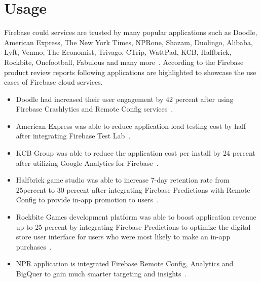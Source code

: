 \section{Usage}
Firebase could services are trusted by many popular applications such as 
Doodle\cite{hid-sp18-409-www-doodle}, American 
Express\cite{hid-sp18-409-www-americanexpress}, The New York 
Times\cite{hid-sp18-409-www-nytimes}, NPRone\cite{hid-sp18-409-www-npr}, 
Shazam\cite{hid-sp18-409-www-shazam}, Duolingo\cite{hid-sp18-409-www-duolingo}, 
Alibaba\cite{hid-sp18-409-www-alibaba}, Lyft\cite{hid-sp18-409-www-lyft}, 
Venmo\cite{hid-sp18-409-www-venmo}, The 
Economist\cite{hid-sp18-409-www-economist}, 
Trivago\cite{hid-sp18-409-www-trivago}, CTrip\cite{hid-sp18-409-www-ctrip}, 
WattPad\cite{hid-sp18-409-www-wattpad}, KCB\cite{hid-sp18-409-www-kcbgroup}, 
Halfbrick\cite{hid-sp18-409-www-halfbrick}, 
Rockbite\cite{hid-sp18-409-www-rockbitegames}, 
Onefootball\cite{hid-sp18-409-www-onefootball}, 
Fabulous\cite{hid-sp18-409-www-thefabulous} and many 
more~\cite{hid-sp18-409-www-firebase,hid-sp18-409-www-firebase-usecases}. 
According to the Firebase product review reports following applications are 
highlighted to showcase the use cases of Firebase cloud services.
\begin{itemize}
	\item Doodle had increased their user engagement by 42 percent after using 
	Firebase Crashlytics and Remote Config 
	services~\cite{hid-sp18-409-www-doodle, 
		hid-sp18-409-www-firebase-usecases}. 
	
	\item American Express was able to reduce application load testing cost by 
	half after integrating Firebase Test 
	Lab~\cite{hid-sp18-409-www-americanexpress}. 
	
	\item KCB Group was able to reduce the application cost per install by 24 
	percent after utilizing Google Analytics for 
	Firebase~\cite{hid-sp18-409-www-kcbgroup, 
		hid-sp18-409-www-firebase-usecases}.
	
	\item Halfbrick game studio was able to increase 7-day retention rate from 
	25percent to 30 percent after integrating Firebase Predictions with Remote 
	Config to provide in-app promotion to 
	users~\cite{hid-sp18-409-www-halfbrick, hid-sp18-409-www-firebase-usecases}.
	
	\item Rockbite Games development platform was able to boost application 
	revenue up to 25 percent by integrating Firebase Predictions to optimize 
	the digital store user interface for users who were most likely to make an 
	in-app purchases~\cite{hid-sp18-409-www-rockbitegames}.
	
	\item NPR application is integrated Firebase Remote Config, Analytics and 
	BigQuer to gain much smarter targeting and 
	insights~\cite{hid-sp18-409-www-firebase-usecases}.
\end{itemize}

